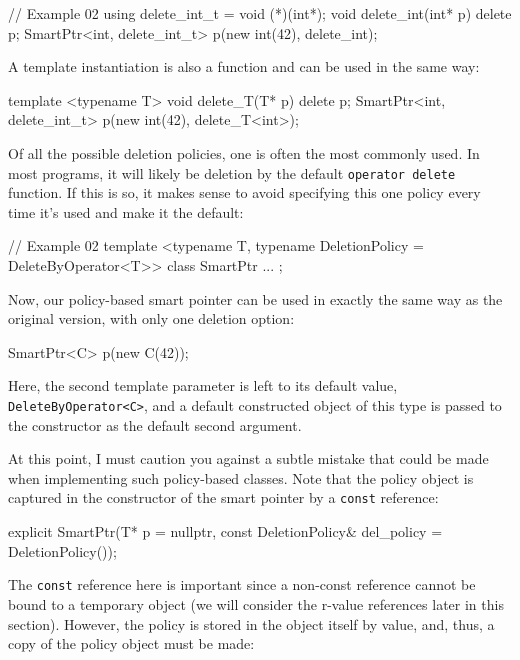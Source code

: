 \begin{code}
// Example 02
using delete_int_t = void (*)(int*);
void delete_int(int* p) { delete p; }
SmartPtr<int, delete_int_t> p(new int(42), delete_int);
\end{code}

A template instantiation is also a function and can be used in the same way:

\begin{code}
template <typename T> void delete_T(T* p) { delete p; }
SmartPtr<int, delete_int_t> p(new int(42), delete_T<int>);
\end{code}

Of all the possible deletion policies, one is often the most commonly used. In most programs, it will likely be deletion by the default \texttt{operator\ delete} function. If this is so, it makes sense to avoid specifying this one policy every time it's used and make it the default:

\begin{code}
// Example 02
template <typename T,
          typename DeletionPolicy = DeleteByOperator<T>>
class SmartPtr {
  ...
};
\end{code}

Now, our policy-based smart pointer can be used in exactly the same way as the original version, with only one deletion option:

\begin{code}
SmartPtr<C> p(new C(42));
\end{code}

Here, the second template parameter is left to its default value, \texttt{DeleteByOperator\textless{}C\textgreater{}}, and a default constructed object of this type is passed to the constructor as the default second argument.

At this point, I must caution you against a subtle mistake that could be made when implementing such policy-based classes. Note that the policy object is captured in the constructor of the smart pointer by a \texttt{const} reference:

\begin{code}
explicit SmartPtr(T* p = nullptr,
  const DeletionPolicy& del_policy = DeletionPolicy());
\end{code}

The \texttt{const} reference here is important since a non-const reference cannot be bound to a temporary object (we will consider the r-value references later in this section). However, the policy is stored in the object itself by value, and, thus, a copy of the policy object must be made:

